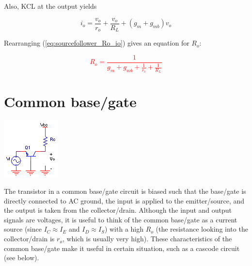 \noindent Also, KCL at the output yields

\begin{equation}
i_{o} = \frac{v_{o}}{r_{o}} + \frac{v_{o}}{R_{L}} + (g_{m}+g_{mb})v_{o}
\label{eq:sourcefollower_Ro_io}
\end{equation}

\noindent Rearranging (\ref{eq:sourcefollower_Ro_io}) gives an equation for $R_{o}$:

\textcolor{red}{
\begin{equation}
R_{o} = \frac{1}{g_{m}+g_{mb}+\frac{1}{r_{o}}+\frac{1}{R_{L}}}
\label{eq:sourcefollower_Ro}
\end{equation}
}

\section{Common base/gate}
\begin{center}
	\includegraphics{schematics/commonbase.PNG}
\end{center}
The transistor in a common base/gate circuit is biased such that the base/gate is directly connected to AC ground, the input is applied to the emitter/source, and the output is taken from the collector/drain. Although the input and output signals are voltages, it is useful to think of the common base/gate as a current source (since $I_{C} \approx I_{E}$ and $I_{D} \approx I_{S}$) with a high $R_{o}$ (the resistance looking into the collector/drain is $r_{o}$, which is usually very high). These characteristics of the common base/gate make it useful in certain situation, such as a cascode circuit (see below).

